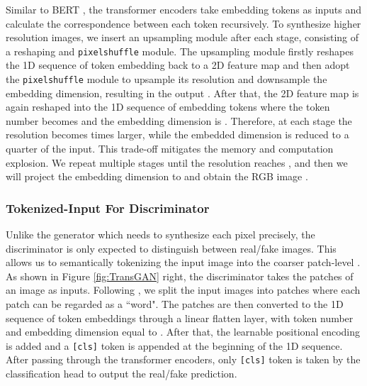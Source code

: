 \documentclass{article}
\begin{document}
Similar to BERT \cite{devlin2018bert}, the transformer encoders take embedding tokens as inputs and calculate the correspondence between each token recursively.  To synthesize higher resolution images, we insert an upsampling module after each stage, consisting of a reshaping and \texttt{pixelshuffle} \cite{shi2016real} module. The upsampling module firstly reshapes the 1D sequence of token embedding back to a 2D feature map  and then adopt the \texttt{pixelshuffle} module to upsample its resolution and downsample the embedding dimension, resulting in the output . After that, the 2D feature map  is again reshaped into the 1D sequence of embedding tokens where the token number becomes  and the embedding dimension is .  Therefore, at each stage the resolution  becomes  times larger, while the embedded dimension  is reduced to a quarter of the input. This trade-off mitigates the memory and computation explosion. We repeat multiple stages until the resolution reaches , and then we will project the embedding dimension to  and obtain the RGB image .



\subsubsection{Tokenized-Input For Discriminator}
Unlike the generator which needs to synthesize each pixel precisely, the discriminator is only expected to distinguish between real/fake images. This allows us to semantically tokenizing the input image into the coarser patch-level \cite{dosovitskiy2020image}. As shown in Figure \ref{fig:TransGAN} right, the discriminator takes the patches of an image as inputs. Following \cite{dosovitskiy2020image}, we split the input images  into  patches where each patch can be regarded as a ``word". The  patches are then converted to the 1D sequence of token embeddings through a linear flatten layer, with token number   and embedding dimension equal to . After that, the learnable positional encoding is added and a \texttt{[cls]} token is appended at the beginning of the 1D sequence.  After passing through the transformer encoders, only \texttt{[cls]} token is taken by the classification head to output the real/fake prediction.
\end{document}
